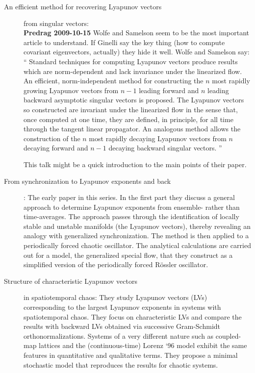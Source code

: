 \begin{description}
\item[An efficient method for recovering Lyapunov vectors] from
singular vectors:
\\
{\bf Predrag 2009-10-15} Wolfe
and Samelson seem to be the most important article to
understand. If Ginelli \etal{} say the key
thing (how to compute covariant eigenvectors, actually) they
hide it well.
Wolfe and Samelson say: `` Standard techniques for computing
Lyapunov vectors produce results which are norm-dependent and
lack invariance under the linearized flow. An efficient,
norm-independent method for constructing the $n$ most rapidly
growing Lyapunov vectors from $n\!-\!1$ leading forward and  $n$
leading backward asymptotic singular vectors is proposed. The
Lyapunov vectors so constructed are invariant under the
linearized flow in the sense that, once computed at one time,
they are defined, in principle, for all time through the
tangent linear propagator.
			\inCB
An analogous method allows the
construction of the $n$ most rapidly decaying Lyapunov vectors
from $n$ decaying forward and $n\!-\!1$ decaying backward singular
vectors. ''

{This talk} might be a quick introduction to the main points of their
paper.

\item[From synchronization to Lyapunov exponents and
              back]:
The early paper in this series.
In the first part they discuss a general approach to determine
Lyapunov exponents from ensemble- rather than time-averages.
The approach passes through the identification of locally
stable and unstable manifolds (the Lyapunov vectors), thereby
revealing an analogy with generalized synchronization. The
method is then applied to a periodically forced chaotic
oscillator. The
analytical calculations are carried out for a model, the
generalized special flow, that they construct as a simplified
version of the periodically forced R\"ossler oscillator.

\item[Structure of characteristic {L}yapunov vectors]
in spatiotemporal chaos:
They study Lyapunov vectors (LVs) corresponding to
the largest Lyapunov exponents in systems with spatiotemporal
chaos. They focus on characteristic LVs and compare the results
with backward LVs obtained via successive Gram-Schmidt
orthonormalizations. Systems of a very different nature such
as coupled-map lattices and the (continuous-time) Lorenz `96
model exhibit the same features in quantitative and
qualitative terms. They propose a minimal
stochastic model that reproduces the results for chaotic
systems.


\end{description}
